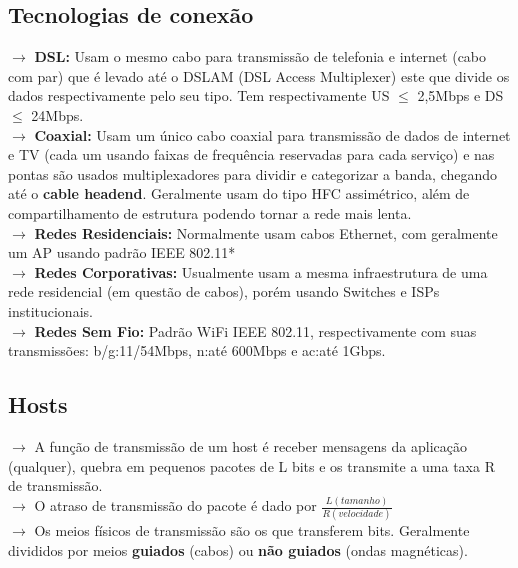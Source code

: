 \documentclass[12pt]{article}
\begin{document}
    \subsection{Tecnologias de conexão}
    $\rightarrow$ \textbf{DSL:} Usam o mesmo cabo para transmissão de telefonia e internet (cabo com par) que é levado até o DSLAM (DSL Access Multiplexer) este que divide os dados respectivamente pelo seu tipo. Tem respectivamente US $\leq$ 2,5Mbps e DS $\leq$ 24Mbps.
    \\$\rightarrow$ \textbf{Coaxial:} Usam um único cabo coaxial para transmissão de dados de internet e TV (cada um usando faixas de frequência reservadas para cada serviço) e nas pontas são usados multiplexadores para dividir e categorizar a banda, chegando até o \textbf{cable headend}. Geralmente usam do tipo HFC assimétrico, além de compartilhamento de estrutura podendo tornar a rede mais lenta.
    \\$\rightarrow$ \textbf{Redes Residenciais:} Normalmente usam cabos Ethernet, com geralmente um AP usando padrão IEEE 802.11*
    \\$\rightarrow$ \textbf{Redes Corporativas:} Usualmente usam a mesma infraestrutura de uma rede residencial (em questão de cabos), porém usando Switches e ISPs institucionais.
    \\$\rightarrow$ \textbf{Redes Sem Fio:} Padrão WiFi IEEE 802.11, respectivamente com suas transmissões: b/g:11/54Mbps, n:até 600Mbps e ac:até 1Gbps.

    \subsection{Hosts}
    $\rightarrow$ A função de transmissão de um host é receber mensagens da aplicação (qualquer), quebra em pequenos pacotes de L bits e os transmite a uma taxa R de transmissão.
    \\$\rightarrow$ O atraso de transmissão do pacote é dado por $\frac{L (tamanho)}{R (velocidade)}$
    \\$\rightarrow$ Os meios físicos de transmissão são os que transferem bits. Geralmente divididos por meios \textbf{guiados} (cabos) ou \textbf{não guiados} (ondas magnéticas).
    


\end{document}

